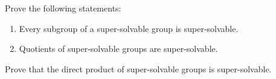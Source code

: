 \begin{exercise}
\label{xca:super}
Prove the following statements: 
\begin{enumerate}
\item Every subgroup of a super-solvable group is super-solvable. 
\item Quotients of super-solvable groups are super-solvable. 
\end{enumerate}
\end{exercise}


\begin{exercise}
\label{xca:directosuper}
Prove that the direct product of super-solvable groups is super-solvable. 
\end{exercise}

